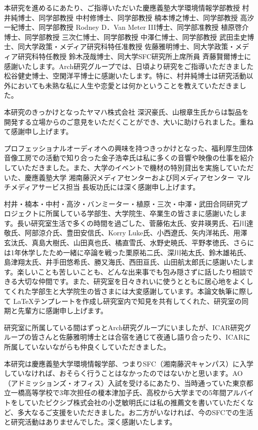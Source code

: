 \begin{acknowledgment}

  本研究を進めるにあたり、ご指導いただいた慶應義塾大学環境情報学部教授 村井純博士、同学部教授 中村修博士、同学部教授 楠本博之博士、同学部教授 高汐一紀博士、同学部教授 Rodney D．Van Meter III博士、同学部准教授 植原啓介博士、同学部教授 三次仁博士、同学部教授 中澤仁博士、同学部教授 武田圭史博士、同大学政策・メディア研究科特任准教授 佐藤雅明博士、同大学政策・メディア研究科特任教授 鈴木茂哉博士、同大学SFC研究所上席所員 斉藤賢爾博士に感謝いたします。Arch研究グループでは、日頃より研究をご指導いただきました松谷健史博士、空閑洋平博士に感謝いたします。特に、村井純博士は研究活動以外においても未熟な私に人生や恋愛とは何かということを教えていただきました。

  本研究のきっかけとなったヤマハ株式会社 深沢豪氏、山根章生氏からは製品を開発する立場からのご意見をいただくことができ、大いに助けられました。重ねて感謝申し上げます。

  プロフェッショナルオーディオへの興味を持つきっかけとなった、福利厚生団体音像工房での活動で知り合った金子浩幸氏は私に多くの音響や映像の仕事を紹介していただきました。また、大学のイベントで機材の特別貸出を実施していただいた、慶應義塾大学 湘南藤沢メディアセンターおよび同メディアセンター マルチメディアサービス担当 長坂功氏には深く感謝申し上げます。

  村井・楠本・中村・高汐・バンミーター・植原・三次・中澤・武田合同研究プロジェクトに所属している学部生、大学院生、卒業生の皆さまに感謝いたします。長い研究室生活で多くの時間を過ごした、菅藤佑太氏、安井瑛男氏、石川達敬氏、阿部涼介氏、豊田安信氏、Korry Luke氏、小西遼氏、矢内洋祐氏、用澤玄汰氏、真島大樹氏、山田真也氏、橘直雪氏、水野史暁氏、平野孝徳氏、さらには1年休学したため一緒に卒論を戦った栗原祐二氏、深川祐太氏、鈴木雄祐氏、島津翔太氏、井手田悠希氏、勝又海氏、西田亘氏、山田航太郎氏に感謝いたします。楽しいことも苦しいことも、どんな出来事でも包み隠さずに話したり相談できる大切な仲間です。また、研究室を日々きれいに使うとともに居心地をよくしてくれた学部生と大学院生の皆さまには大変感謝しています。本論文執筆に際して \LaTeX テンプレートを作成し研究室内で知見を共有してくれた、研究室の同期と先輩方に感謝申し上げます。

  研究室に所属している間はずっとArch研究グループにいましたが、ICAR研究グループの皆さんと佐藤雅明博士とは合宿を通じて夜通し語り合ったり、ICARに所属していないながらも仲良くしていただきました。

  本研究は慶應義塾大学環境情報学部、つまりSFC（湘南藤沢キャンパス）に入学していなければ、おそらく行うことはなかったのではないかと思います。AO（アドミッションズ・オフィス）入試を受けるにあたり、当時通っていた東京都立一橋高等学校で3年次担任の榎本津加子氏、高校から大学までの5年間アルバイトをしていたピクシブ株式会社の小芝敏明氏には私の推薦文を書いていただくなど、多大なるご支援をいただきました。お二方がいなければ、今のSFCでの生活と研究活動はありませんでした。深く感謝いたします。


\end{acknowledgment}
